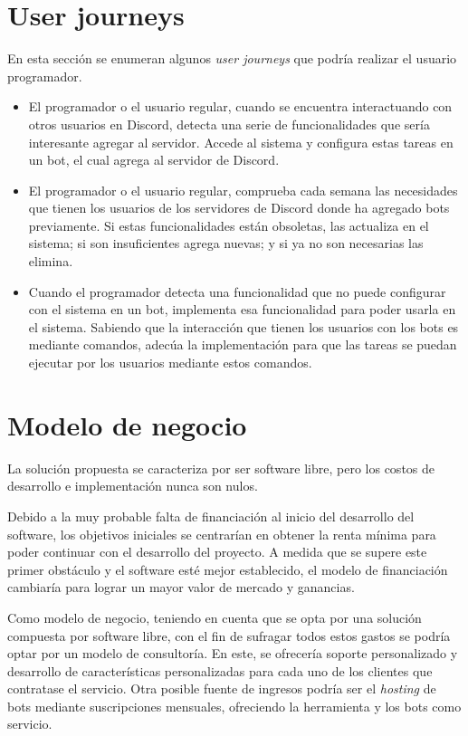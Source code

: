 \bigskip
\bigskip
\bigskip
\bigskip
\bigskip
\pagebreak

\section{User journeys}

En esta sección se enumeran algunos \textit{user journeys} que podría realizar el usuario programador.

\begin{itemize}
	\item El programador o el usuario regular, cuando se encuentra interactuando con otros usuarios en Discord, detecta una serie de funcionalidades que sería interesante agregar al servidor. Accede al sistema y configura estas tareas en un bot, el cual agrega al servidor de Discord.
	\item El programador o el usuario regular, comprueba cada semana las necesidades que tienen los usuarios de los servidores de Discord donde ha agregado bots previamente. Si estas funcionalidades están obsoletas, las actualiza en el sistema; si son insuficientes agrega nuevas; y si ya no son necesarias las elimina.
	\item Cuando el programador detecta una funcionalidad que no puede configurar con el sistema en un bot, implementa esa funcionalidad para poder usarla en el sistema. Sabiendo que la interacción que tienen los usuarios con los bots es mediante comandos, adecúa la implementación para que las tareas se puedan ejecutar por los usuarios mediante estos comandos.
\end{itemize}


\section{Modelo de negocio}

La solución propuesta se caracteriza por ser software libre, pero los costos de desarrollo e implementación nunca son nulos.

Debido a la muy probable falta de financiación al inicio del desarrollo del software, los objetivos iniciales se centrarían en obtener la renta mínima para poder continuar con el desarrollo del proyecto. A medida que se supere este primer obstáculo y el software esté mejor establecido, el modelo de financiación cambiaría para lograr un mayor valor de mercado y ganancias.

Como modelo de negocio, teniendo en cuenta que se opta por una solución compuesta por software libre, con el fin de sufragar todos estos gastos se podría optar por un modelo de consultoría. En este, se ofrecería soporte personalizado y desarrollo de características personalizadas para cada uno de los clientes que contratase el servicio. Otra posible fuente de ingresos podría ser el \textit{hosting} de bots mediante suscripciones mensuales, ofreciendo la herramienta y los bots como servicio.

